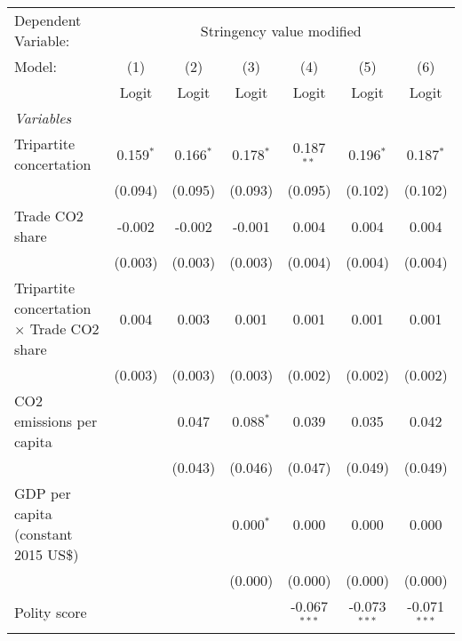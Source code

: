 
\begingroup
\centering
\begin{tabular}{lcccccc}
   \toprule
   Dependent Variable: & \multicolumn{6}{c}{Stringency value modified}\\
   Model:                                            & (1)         & (2)         & (3)         & (4)            & (5)            & (6)\\  
                                                     &  Logit      & Logit       & Logit       & Logit          & Logit          & Logit\\  
   \midrule
   \emph{Variables}\\
   Tripartite concertation                           & 0.159$^{*}$ & 0.166$^{*}$ & 0.178$^{*}$ & 0.187$^{**}$   & 0.196$^{*}$    & 0.187$^{*}$\\   
                                                     & (0.094)     & (0.095)     & (0.093)     & (0.095)        & (0.102)        & (0.102)\\   
   Trade CO2 share                                   & -0.002      & -0.002      & -0.001      & 0.004          & 0.004          & 0.004\\   
                                                     & (0.003)     & (0.003)     & (0.003)     & (0.004)        & (0.004)        & (0.004)\\   
   Tripartite concertation $\times$ Trade CO2 share  & 0.004       & 0.003       & 0.001       & 0.001          & 0.001          & 0.001\\   
                                                     & (0.003)     & (0.003)     & (0.003)     & (0.002)        & (0.002)        & (0.002)\\   
   CO2 emissions per capita                          &             & 0.047       & 0.088$^{*}$ & 0.039          & 0.035          & 0.042\\   
                                                     &             & (0.043)     & (0.046)     & (0.047)        & (0.049)        & (0.049)\\   
   GDP per capita (constant 2015 US\$)               &             &             & 0.000$^{*}$ & 0.000          & 0.000          & 0.000\\   
                                                     &             &             & (0.000)     & (0.000)        & (0.000)        & (0.000)\\   
   Polity score                                      &             &             &             & -0.067$^{***}$ & -0.073$^{***}$ & -0.071$^{***}$\\   

\end{tabular}
